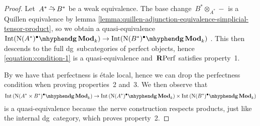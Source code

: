 \begin{refsection}
\begin{theorem}
\begin{proof}[Proof]
    Let~$A^*\weq B^*$ be a weak equivalence. The base change~$B^*\otimes_{A^*}-$ is a Quillen equivalence by lemma \ref{lemma:quillen-adjunction-equivalence-simplicial-tensor-product}, so we obtain a quasi-equivalence~$\Int(\dgMod{\nerve(A^*)^\bullet}_k)\to\Int(\dgMod{\nerve(B^*)^\bullet}_k)$ \cite[proposition 3.2]{toen}. This then descends to the full dg~subcategories of perfect objects, hence \eqref{equation:condition-1} is a quasi-equivalence and~$\mathbf{R}\mathrm{Perf}$ satisfies property~1.

    By \cite[corollary 1.3.7.4]{hagII} we have that perfectness is \'etale local, hence we can drop the perfectness condition when proving properties~2 and~3. We then observe that
    \begin{equation}
      \Int\left( \dgMod{\nerve(A^*\times B^*)^\bullet}_k \right)\to\Int\left( \dgMod{\nerve(A^*)^\bullet}_k \right)\times\Int\left( \dgMod{\nerve(B^*)^\bullet}_k \right)
    \end{equation}
    is a quasi-equivalence because the nerve construction respects products, just like the internal dg~category, which proves property~2.


\end{proof}
\end{theorem}
\end{refsection}
